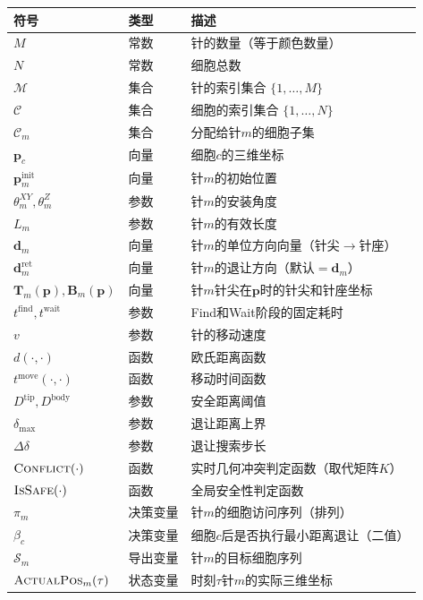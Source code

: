 \documentclass[11pt,a4paper]{article}
\begin{document}
\begin{table}[H]
\centering
\small
\begin{tabular}{|l|l|p{8cm}|}
\hline
\textbf{符号} & \textbf{类型} & \textbf{描述} \\
\hline
$M$ & 常数 & 针的数量（等于颜色数量） \\
$N$ & 常数 & 细胞总数 \\
$\mathcal{M}$ & 集合 & 针的索引集合 $\{1,\ldots,M\}$ \\
$\mathcal{C}$ & 集合 & 细胞的索引集合 $\{1,\ldots,N\}$ \\
$\mathcal{C}_m$ & 集合 & 分配给针$m$的细胞子集 \\
\hline
$\mathbf{p}_c$ & 向量 & 细胞$c$的三维坐标 \\
$\mathbf{p}_m^{\text{init}}$ & 向量 & 针$m$的初始位置 \\
$\theta_m^{XY}, \theta_m^Z$ & 参数 & 针$m$的安装角度 \\
$L_m$ & 参数 & 针$m$的有效长度 \\
$\mathbf{d}_m$ & 向量 & 针$m$的单位方向向量（针尖$\to$针座） \\
$\mathbf{d}_m^{\text{ret}}$ & 向量 & 针$m$的退让方向（默认$= \mathbf{d}_m$） \\
$\mathbf{T}_m(\mathbf{p}), \mathbf{B}_m(\mathbf{p})$ & 向量 & 针$m$针尖在$\mathbf{p}$时的针尖和针座坐标 \\
\hline
$t^{\text{find}}, t^{\text{wait}}$ & 参数 & Find和Wait阶段的固定耗时 \\
$v$ & 参数 & 针的移动速度 \\
$d(\cdot,\cdot)$ & 函数 & 欧氏距离函数 \\
$t^{\text{move}}(\cdot,\cdot)$ & 函数 & 移动时间函数 \\
\hline
$D^{\text{tip}}, D^{\text{body}}$ & 参数 & 安全距离阈值 \\
$\delta_{\max}$ & 参数 & 退让距离上界 \\
$\Delta\delta$ & 参数 & 退让搜索步长 \\
$\textsc{Conflict}(\cdot)$ & 函数 & 实时几何冲突判定函数（取代矩阵$K$） \\
$\textsc{IsSafe}(\cdot)$ & 函数 & 全局安全性判定函数 \\
\hline
$\pi_m$ & 决策变量 & 针$m$的细胞访问序列（排列） \\
$\beta_c$ & 决策变量 & 细胞$c$后是否执行最小距离退让（二值） \\
$\mathcal{S}_m$ & 导出变量 & 针$m$的目标细胞序列 \\
\hline
$\textsc{ActualPos}_m(\tau)$ & 状态变量 & 时刻$\tau$针$m$的实际三维坐标 \\

\end{tabular}
\end{table}
\end{document}
